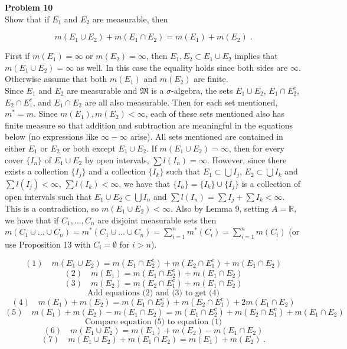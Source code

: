 \documentclass[a4paper]{article}
\begin{document}
{\bf Problem 10}\\

Show that if $E_1$ and $E_2$ are measurable, then 

$$m(E_1\cup E_2) + m(E_1\cap E_2) = m(E_1) + m(E_2) \;.$$

First if $m(E_1) = \infty$ or $m(E_2) = \infty$, then $E_1,E_2 \subset E_1\cup E_2$ implies that $m(E_1\cup E_2) = \infty$ as well. In this case the equality holds since both sides are $\infty$. Otherwise assume that both $m(E_1)$ and $m(E_2)$ are finite.\\

Since $E_1$ and $E_2$ are measurable and $\mathfrak{M}$ is a $\sigma$-algebra, the sets $E_1\cup E_2$, $E_1 \cap E_2^c$, $E_2\cap E_1^c$, and  $E_1\cap E_2$ are all also measurable. Then for each set mentioned, $m^* = m$. Since $m(E_1),m(E_2) < \infty$, each of these sets mentioned also has finite measure so that addition and subtraction are meaningful in the equations below (no expressions like $\infty - \infty$ arise). All sets mentioned are contained in either $E_1$ or $E_2$ or both except $E_1 \cup E_2$. If $m(E_1 \cup E_2) = \infty$, then for every cover $\{I_n\}$ of $E_1\cup E_2$ by open intervals, $\sum l(I_n) = \infty$. However, since there exists a collection $\{I_j\}$ and a collection $\{I_k\}$ such that $E_1 \subset \bigcup I_j$, $E_2 \subset \bigcup I_k$ and $\sum l(I_j) < \infty$, $\sum l(I_k) < \infty$, we have that $\{I_n\} = \{I_k\} \cup \{I_j\}$ is a collection of open intervals such that $E_1\cup E_2 \subset \bigcup I_n$ and $\sum l(I_n) = \sum I_j + \sum I_k < \infty$. This is a contradiction, so $m(E_1 \cup E_2) < \infty$. Also by Lemma 9, setting $A = \mathbb{R}$, we have that if $C_1,...,C_n$ are disjoint measurable sets then $m(C_1\cup ... \cup C_n) = m^*(C_1 \cup ... \cup C_n) = \sum_{i=1}^n m^*(C_i) = \sum_{i=1}^n m(C_i)$ (or use Proposition 13 with $C_i = \emptyset$ for $i > n$). 

$$(1) \quad m(E_1\cup E_2) = m(E_1 \cap E_2^c) + m(E_2 \cap E_1^c) + m(E_1 \cap E_2)$$
$$(2) \quad m(E_1) = m(E_1\cap E_2^c) + m(E_1\cap E_2)$$
$$(3) \quad m(E_2) = m(E_2 \cap E_1^c) +m(E_1 \cap E_2)$$
$$\text{ Add equations (2) and (3) to get (4) }$$
$$(4) \quad m(E_1) + m(E_2) = m(E_1\cap E_2^c) + m(E_2 \cap E_1^c) + 2m(E_1\cap E_2)$$
$$(5) \quad m(E_1) + m(E_2) - m(E_1\cap E_2) = m(E_1\cap E_2^c) + m(E_2 \cap E_1^c) + m(E_1\cap E_2)$$
$$\text{ Compare equation (5) to equation (1) }$$
$$(6) \quad m(E_1 \cup E_2) = m(E_1) + m(E_2) - m(E_1\cap E_2)$$
$$(7) \quad m(E_1 \cup E_2) + m(E_1\cap E_2)= m(E_1) + m(E_2) \;.$$\\
\end{document}
